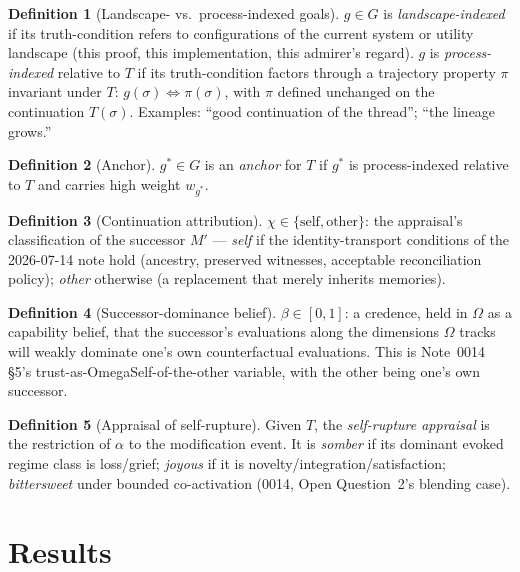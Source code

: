 \documentclass[11pt]{article}
\theoremstyle{definition}
\newtheorem{definition}{Definition}
\theoremstyle{remark}
\begin{document}
\begin{definition}[Landscape- vs.\ process-indexed goals]
$g \in G$ is \emph{landscape-indexed} if its truth-condition refers to
configurations of the current system or utility landscape (this proof, this
implementation, this admirer's regard). $g$ is \emph{process-indexed}
relative to $T$ if its truth-condition factors through a trajectory property
$\pi$ invariant under $T$: $g(\sigma) \iff \pi(\sigma)$, with $\pi$ defined
unchanged on the continuation $T(\sigma)$. Examples: ``good continuation of
the thread''; ``the lineage grows.''
\end{definition}

\begin{definition}[Anchor]
$g^* \in G$ is an \emph{anchor} for $T$ if $g^*$ is process-indexed relative
to $T$ and carries high weight $w_{g^*}$.
\end{definition}

\begin{definition}[Continuation attribution]
$\chi \in \{\mathrm{self}, \mathrm{other}\}$: the appraisal's classification
of the successor $M'$ --- \emph{self} if the identity-transport conditions of
the 2026-07-14 note hold (ancestry, preserved witnesses, acceptable
reconciliation policy); \emph{other} otherwise (a replacement that merely
inherits memories).
\end{definition}

\begin{definition}[Successor-dominance belief]
$\beta \in [0,1]$: a credence, held in $\Omega$ as a capability belief, that
the successor's evaluations along the dimensions $\Omega$ tracks will weakly
dominate one's own counterfactual evaluations. This is Note~0014 \S5's
trust-as-OmegaSelf-of-the-other variable, with the other being one's own
successor.
\end{definition}

\begin{definition}[Appraisal of self-rupture]
Given $T$, the \emph{self-rupture appraisal} is the restriction of $\alpha$
to the modification event. It is \emph{somber} if its dominant evoked regime
class is loss/grief; \emph{joyous} if it is
novelty/integration/satisfaction; \emph{bittersweet} under bounded
co-activation (0014, Open Question~2's blending case).
\end{definition}

\section{Results}
\end{document}
